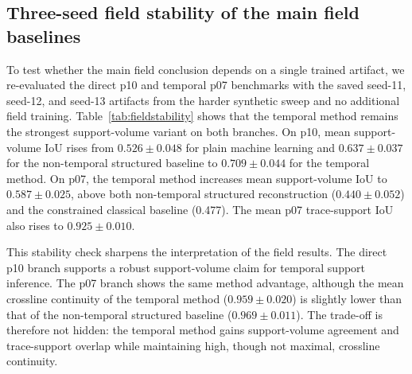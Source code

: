 \documentclass[preprint,12pt]{elsarticle}
\begin{document}
\subsection{Three-seed field stability of the main field baselines}

To test whether the main field conclusion depends on a single trained artifact, we re-evaluated the direct p10 and temporal p07 benchmarks with the saved seed-11, seed-12, and seed-13 artifacts from the harder synthetic sweep and no additional field training. Table~\ref{tab:fieldstability} shows that the temporal method remains the strongest support-volume variant on both branches. On p10, mean support-volume IoU rises from $0.526 \pm 0.048$ for plain machine learning and $0.637 \pm 0.037$ for the non-temporal structured baseline to $0.709 \pm 0.044$ for the temporal method. On p07, the temporal method increases mean support-volume IoU to $0.587 \pm 0.025$, above both non-temporal structured reconstruction ($0.440 \pm 0.052$) and the constrained classical baseline (0.477). The mean p07 trace-support IoU also rises to $0.925 \pm 0.010$.

This stability check sharpens the interpretation of the field results. The direct p10 branch supports a robust support-volume claim for temporal support inference. The p07 branch shows the same method advantage, although the mean crossline continuity of the temporal method ($0.959 \pm 0.020$) is slightly lower than that of the non-temporal structured baseline ($0.969 \pm 0.011$). The trade-off is therefore not hidden: the temporal method gains support-volume agreement and trace-support overlap while maintaining high, though not maximal, crossline continuity.
\end{document}
